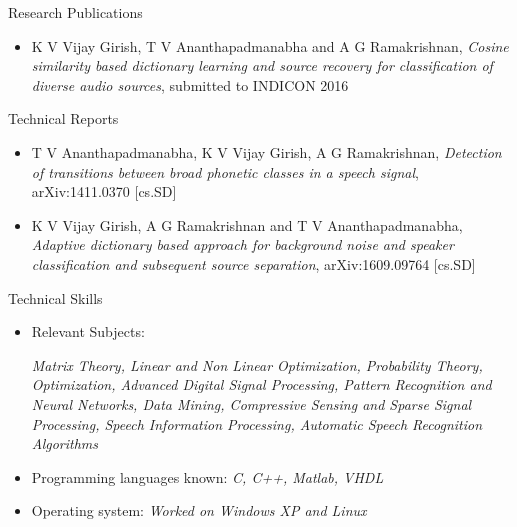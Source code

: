 \documentclass[10pt]{article}
\begin{document}
\begin{cv}
\begin{cvlist}{Research Publications}
\begin{itemize}
\item  K V Vijay Girish, T V Ananthapadmanabha and A G Ramakrishnan,  \textit{Cosine similarity based dictionary learning and source recovery for classification of diverse audio sources}, submitted to INDICON 2016

\end{itemize}

	


\end{cvlist}

\begin{cvlist}{Technical Reports}
\item
\begin{itemize}
\item T V Ananthapadmanabha, K V Vijay Girish, A G Ramakrishnan, \textit{Detection of transitions between broad phonetic classes in a speech signal}, 	arXiv:1411.0370 [cs.SD]

\item  K V Vijay Girish, A G Ramakrishnan and T V Ananthapadmanabha,  \textit{Adaptive dictionary based approach for background noise and speaker classification and subsequent source separation}, 	arXiv:1609.09764 [cs.SD]
\end{itemize}
\end{cvlist}

\begin{cvlist}{Technical Skills}
\item
\begin{itemize}\itemsep=0.25em
	\item Relevant Subjects:

\textit{Matrix Theory,
Linear and Non Linear Optimization, Probability Theory,   Optimization,
Advanced Digital Signal Processing,
Pattern Recognition and Neural Networks, Data Mining, Compressive Sensing and Sparse Signal Processing, Speech Information Processing, Automatic Speech Recognition Algorithms}



	\item Programming languages known:
 \textit{C, C++, Matlab, VHDL}


\item Operating system: \textit{Worked on Windows XP and Linux}




\end{itemize}
\end{cvlist}
\end{cv}
\end{document}
